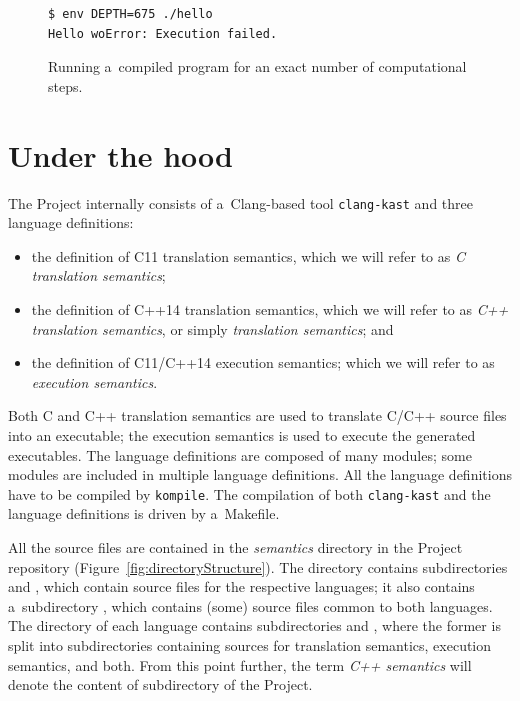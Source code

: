 \documentclass[nolot,nolof,nocover,printed]{fithesis3}
\newcommand{\krun}{\texttt{krun}\xspace}
\newcommand{\kompile}{\texttt{kompile}\xspace}
\newcommand{\clangKast}{\texttt{clang-kast}\xspace}
\newcommand{\Project}{Project\xspace}
\begin{document}
\begin{figure}[ht]
\begin{lstlisting}
$ env DEPTH=675 ./hello
Hello woError: Execution failed.
\end{lstlisting}
\caption{Running a~compiled program for an exact number of computational steps.}
\label{fig:runCompiledProgramWithDepth}
\end{figure}



\section{Under the hood}


The \Project internally consists of a~Clang-based tool \clangKast and 
three language definitions:
\begin{itemize}
\item the definition of C11 translation semantics, which we will refer to as \textit{C translation semantics};
\item the definition of C++14 translation semantics, which we will refer to as \textit{C++ translation semantics}, or simply \textit{translation semantics}; and
\item the definition of C11/C++14 execution semantics; which we will refer to as \textit{execution semantics}.
\end{itemize}
Both C and C++ translation semantics are used to translate C/C++ source files into an executable; the execution semantics is used to execute the generated executables. The language definitions are composed of many modules; some modules are included in multiple language definitions. All the language definitions have to be compiled by \kompile. The compilation of both \clangKast and the language definitions is driven by a~Makefile.

All the \K source files are contained in the \textit{semantics} directory in the Project repository (Figure~\ref{fig:directoryStructure}). The directory contains subdirectories  and , which contain source files for the respective languages; it also contains a~subdirectory , which contains (some) source files common to both languages. The directory of each language contains subdirectories  and , where the former is split into subdirectories containing sources for translation semantics, execution semantics, and both. From this point further, the term \textit{C++ semantics} will denote the content of  subdirectory of the Project.
\end{document}
